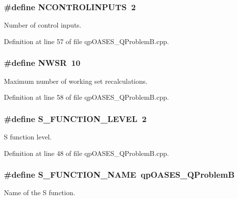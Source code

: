 \subsubsection[{NCONTROLINPUTS}]{\setlength{\rightskip}{0pt plus 5cm}\#define NCONTROLINPUTS~2}\label{qpOASES__QProblemB_8cpp_ab559b6bb26aeb10ecdf5654acc204535}
Number of control inputs. 

Definition at line 57 of file qpOASES\_\-QProblemB.cpp.

\subsubsection[{NWSR}]{\setlength{\rightskip}{0pt plus 5cm}\#define NWSR~10}\label{qpOASES__QProblemB_8cpp_ad4a923bb7993bc9620756fd92bc2cf57}
Maximum number of working set recalculations. 

Definition at line 58 of file qpOASES\_\-QProblemB.cpp.

\subsubsection[{S\_\-FUNCTION\_\-LEVEL}]{\setlength{\rightskip}{0pt plus 5cm}\#define S\_\-FUNCTION\_\-LEVEL~2}\label{qpOASES__QProblemB_8cpp_a9a4ab27953070e39249f3fad28e93749}
S function level. 

Definition at line 48 of file qpOASES\_\-QProblemB.cpp.

\subsubsection[{S\_\-FUNCTION\_\-NAME}]{\setlength{\rightskip}{0pt plus 5cm}\#define S\_\-FUNCTION\_\-NAME~qpOASES\_\-QProblemB}\label{qpOASES__QProblemB_8cpp_a0f61df833e166c743295eebf43f0b142}
Name of the S function. 

